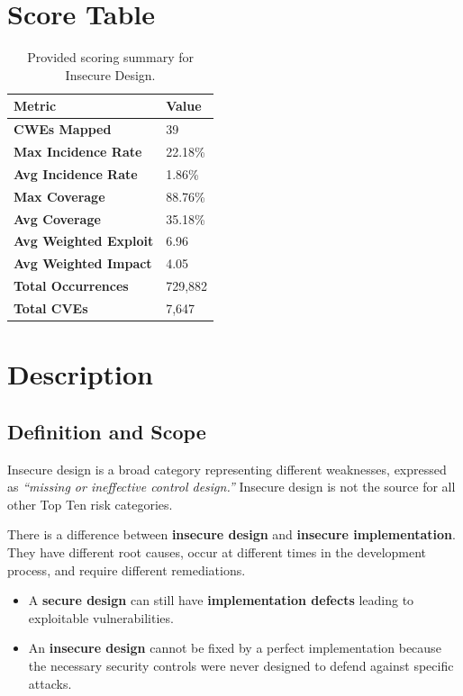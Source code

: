 \documentclass[11pt]{article}
\begin{document}
\section{Score Table}
\begin{table}[h!]
\centering
\renewcommand{\arraystretch}{1.2}
\begin{tabular}{@{}>{\bfseries}p{4.9cm}p{3.1cm}@{}}
\toprule
Metric & Value \\
\midrule
CWEs Mapped & 39 \\
Max Incidence Rate & 22.18\% \\
Avg Incidence Rate & 1.86\% \\
Max Coverage & 88.76\% \\
Avg Coverage & 35.18\% \\
Avg Weighted Exploit & 6.96 \\
Avg Weighted Impact & 4.05 \\
Total Occurrences & 729{,}882 \\
Total CVEs & 7{,}647 \\
\bottomrule
\end{tabular}
\caption{Provided scoring summary for Insecure Design.}
\end{table}

\section{Description}

\subsection{Definition and Scope}
Insecure design is a broad category representing different weaknesses, expressed as \textit{``missing or ineffective control design.''} Insecure design is not the source for all other Top Ten risk categories.

\begin{infobox}
There is a difference between \textbf{insecure design} and \textbf{insecure implementation}. They have different root causes, occur at different times in the development process, and require different remediations.
\begin{itemize}
  \item A \textbf{secure design} can still have \textbf{implementation defects} leading to exploitable vulnerabilities.
  \item An \textbf{insecure design} cannot be fixed by a perfect implementation because the necessary security controls were never designed to defend against specific attacks.
\end{itemize}
\end{infobox}
\end{document}
